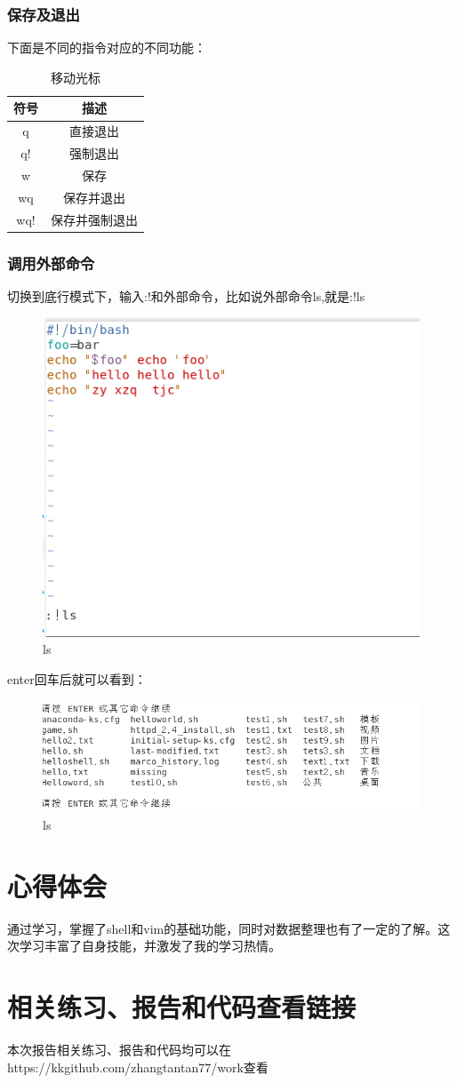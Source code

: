 \documentclass{ctexart}
\begin{document}
	\subsubsection{保存及退出}
	下面是不同的指令对应的不同功能：
	
	\begin{table}[h]
		\centering
		\caption{移动光标}
		\begin{tabular}{|c|c|}
			\hline
			符号 & 描述  \\
			\hline
			q & 直接退出\\
			\hline
			q! & 强制退出\\
			\hline
			w &保存\\ 
			\hline
			wq & 保存并退出\\
			\hline
			wq!&保存并强制退出\\
			\hline
		\end{tabular}
	\end{table}
	
	\subsubsection{调用外部命令}
	切换到底行模式下，输入:!和外部命令，比如说外部命令ls,就是:!ls
	\begin{figure}[H]
		\centering
		\includegraphics{2.44}
		\caption{ls}
	\end{figure}
	
	enter回车后就可以看到：
	\begin{figure}[H]
		\centering
		\includegraphics{2.45}
		\caption{ls}
	\end{figure}

	\section{心得体会}
	通过学习，掌握了shell和vim的基础功能，同时对数据整理也有了一定的了解。这次学习丰富了自身技能，并激发了我的学习热情。
	\section{相关练习、报告和代码查看链接}
	本次报告相关练习、报告和代码均可以在https://kkgithub.com/zhangtantan77/work查看
\end{document}
